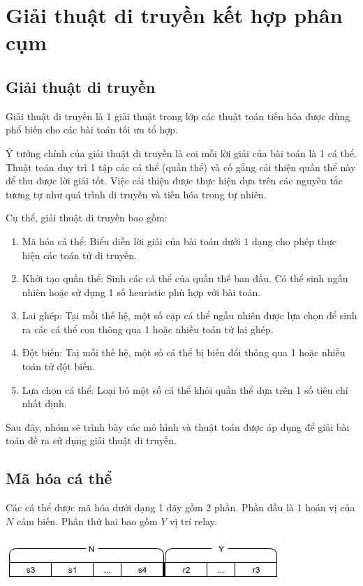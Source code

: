 \documentclass[hidelinks, 11pt, a4paper]{report}
\begin{document}
\chapter{Giải thuật di truyền kết hợp phân cụm}
\section{Giải thuật di truyền}
Giải thuật di truyền là 1 giải thuật trong lớp các thuật toán tiến hóa được dùng phổ biến cho các bài toán tối ưu tổ hợp.

Ý tưởng chính của giải thuật di truyền là coi mỗi lời giải của bài toán là 1 cá thể. Thuật toán duy trì 1 tập các cá thể (quần thể) và cố gắng cải thiện quần thể này để thu được lời giải tốt. Việc cải thiện được thực hiện dựa trên các nguyên tắc tương tự như quá trình di truyền và tiến hóa trong tự nhiên.

Cụ thể, giải thuật di truyền bao gồm:
\begin{enumerate}
    \item Mã hóa cá thể: Biểu diễn lời giải của bài toán dưới 1 dạng cho phép thực hiện các toán tử di truyền.
    \item Khởi tạo quần thể: Sinh các cá thể của quần thể ban đầu. Có thể sinh ngẫu nhiên hoặc sử dụng 1 số heuristic phù hợp với bài toán.
    \item Lai ghép: Tại mỗi thế hệ, một số cặp cá thể ngẫu nhiên được lựa chọn để sinh ra các cá thể con thông qua 1 hoặc nhiều toán tử lai ghép.
    \item Đột biến: Taị mỗi thế hệ, một số cá thể bị biến đổi thông qua 1 hoặc nhiều toán tử đột biến.
    \item Lựa chọn cá thể: Loại bỏ một số cá thể khỏi quần thể dựa trên 1 số tiêu chí nhất định.
\end{enumerate}

Sau đây, nhóm sẽ trình bày các mô hình và thuật toán được áp dụng để giải bài toán đề ra sử dụng giải thuật di truyền.

\section{Mã hóa cá thể}
Các cá thể được mã hóa dưới dạng 1 dãy gồm 2 phần. Phần đầu là 1 hoán vị của $N$ cảm biến. Phần thứ hai bao gồm $Y$ vị trí relay.

\begin{center}
    \includegraphics[scale=0.7]{WusnEncode.png}
\end{center}
\end{document}
